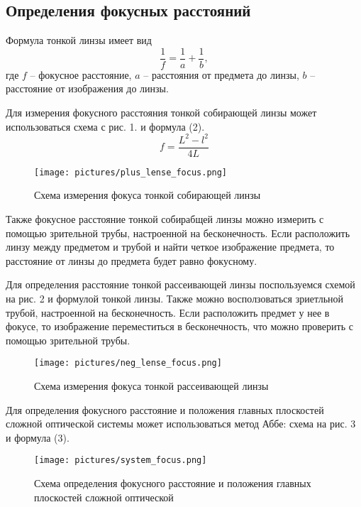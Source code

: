 \documentclass[a4paper,12pt]{article}
\begin{document}
\subsection*{Определения фокусных расстояний}
Формула тонкой линзы имеет вид
\begin{equation}
    \frac{1}{f} = \frac{1}{a} + \frac{1}{b},
\end{equation}
\noindent
где $f$ -- фокусное расстояние, $a$ -- расстояния от предмета до линзы, $b$ -- расстояние от изображения до линзы.

\noindent
Для измерения фокусного расстояния тонкой собирающей линзы может использоваться схема с рис. 1. и формула (2).
\begin{equation}
    f = \frac{L^2 - l^2}{4L}
\end{equation}

\begin{figure}[H]
    \centering
    \texttt{[image: pictures/plus\_lense\_focus.png]}
    \caption{Схема измерения фокуса тонкой собирающей линзы}
\end{figure}

\noindent
Также фокусное расстояние тонкой собирабщей линзы можно измерить с помощью зрительной трубы, настроенной на бесконечность. Если расположить линзу между предметом и трубой и найти четкое изображение предмета, то расстояние от линзы до предмета будет равно фокусному.

\noindent
Для определения расстояние тонкой рассеивающей линзы поспользуемся схемой на рис. 2 и формулой тонкой линзы. Также можно восползоваться зриетльной трубой, настроенной на бесконечность. Если расположить предмет у нее в фокусе, то изображение переместиться в бесконечность, что можно проверить с помощью зрительной трубы.

\begin{figure}[H]
    \centering
    \texttt{[image: pictures/neg\_lense\_focus.png]}
    \caption{Схема измерения фокуса тонкой рассеивающей линзы}
\end{figure}

\noindent
Для определения фокусного расстояние и положения главных плоскостей сложной оптической системы может использоваться метод Аббе: схема на рис. 3 и формула (3).

\begin{figure}[H]
    \centering
    \texttt{[image: pictures/system\_focus.png]}
    \caption{Схема определения фокусного расстояние и положения главных плоскостей сложной оптической}
\end{figure}
\end{document}
